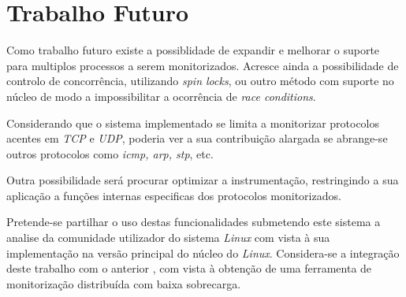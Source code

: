\section{Trabalho Futuro}
\label{sec:future_work}
Como trabalho futuro existe a possiblidade de expandir e melhorar o suporte para multiplos processos a serem monitorizados.
Acresce ainda a possibilidade de controlo de concorrência, utilizando \textit{spin locks}, ou outro método com suporte no núcleo de modo a impossibilitar a ocorrência de \textit{race conditions}.

Considerando que o sistema implementado se limita a monitorizar protocolos acentes em \textit{TCP} e \textit{UDP}, poderia ver a sua contribuição alargada se abrange-se outros protocolos como \textit{icmp, arp, stp}, etc.

Outra possibilidade será procurar optimizar a instrumentação, restringindo a sua aplicação a funções internas especificas dos protocolos monitorizados.

Pretende-se partilhar o uso destas funcionalidades submetendo este sistema a analise da comunidade utilizador do sistema \textit{Linux} com vista à sua implementação na versão principal do núcleo do \textit{Linux}.
Considera-se a integração deste trabalho com o anterior \cite{duarte10,Farruca:2009}, com vista à obtenção de uma ferramenta de monitorização distribuída com baixa sobrecarga.
